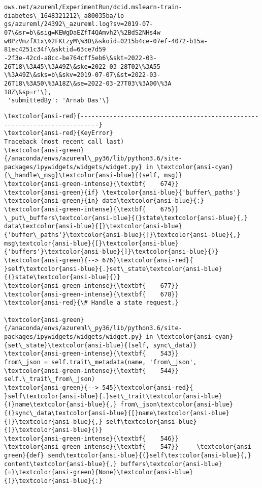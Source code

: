 \documentclass[11pt]{article}
\begin{document}
\begin{tcolorbox}[breakable, size=fbox, boxrule=.5pt, pad at break*=1mm, opacityfill=0]
\begin{Verbatim}[commandchars=\\\{\}]
ows.net/azureml/ExperimentRun/dcid.mslearn-train-diabetes\_1648321212\_a80035ba/lo
gs/azureml/24392\_azureml.log?sv=2019-07-07\&sr=b\&sig=KEWgDaEZfT4QAmvh2\%2BdS2NHs4w
w0PzVmzfX1x\%2FKtzyM\%3D\&skoid=0215b4ce-07ef-4072-b15a-81ec4251c34f\&sktid=63ce7d59
-2f3e-42cd-a8cc-be764cff5eb6\&skt=2022-03-26T18\%3A45\%3A49Z\&ske=2022-03-28T02\%3A55
\%3A49Z\&sks=b\&skv=2019-07-07\&st=2022-03-26T18\%3A50\%3A18Z\&se=2022-03-27T03\%3A00\%3A
18Z\&sp=r'\},
 'submittedBy': 'Arnab Das'\}
\end{Verbatim}
\end{tcolorbox}
        
    \begin{Verbatim}[commandchars=\\\{\}, frame=single, framerule=2mm, rulecolor=\color{outerrorbackground}]
\textcolor{ansi-red}{---------------------------------------------------------------------------}
\textcolor{ansi-red}{KeyError}                                  Traceback (most recent call last)
\textcolor{ansi-green}{/anaconda/envs/azureml\_py36/lib/python3.6/site-packages/ipywidgets/widgets/widget.py} in \textcolor{ansi-cyan}{\_handle\_msg}\textcolor{ansi-blue}{(self, msg)}
\textcolor{ansi-green-intense}{\textbf{    674}}                 \textcolor{ansi-green}{if} \textcolor{ansi-blue}{'buffer\_paths'} \textcolor{ansi-green}{in} data\textcolor{ansi-blue}{:}
\textcolor{ansi-green-intense}{\textbf{    675}}                     \_put\_buffers\textcolor{ansi-blue}{(}state\textcolor{ansi-blue}{,} data\textcolor{ansi-blue}{[}\textcolor{ansi-blue}{'buffer\_paths'}\textcolor{ansi-blue}{]}\textcolor{ansi-blue}{,} msg\textcolor{ansi-blue}{[}\textcolor{ansi-blue}{'buffers'}\textcolor{ansi-blue}{]}\textcolor{ansi-blue}{)}
\textcolor{ansi-green}{--> 676}\textcolor{ansi-red}{                 }self\textcolor{ansi-blue}{.}set\_state\textcolor{ansi-blue}{(}state\textcolor{ansi-blue}{)}
\textcolor{ansi-green-intense}{\textbf{    677}} 
\textcolor{ansi-green-intense}{\textbf{    678}}         \textcolor{ansi-red}{\# Handle a state request.}

\textcolor{ansi-green}{/anaconda/envs/azureml\_py36/lib/python3.6/site-packages/ipywidgets/widgets/widget.py} in \textcolor{ansi-cyan}{set\_state}\textcolor{ansi-blue}{(self, sync\_data)}
\textcolor{ansi-green-intense}{\textbf{    543}}                     from\_json = self.trait\_metadata(name, 'from\_json',
\textcolor{ansi-green-intense}{\textbf{    544}}                                                     self.\_trait\_from\_json)
\textcolor{ansi-green}{--> 545}\textcolor{ansi-red}{                     }self\textcolor{ansi-blue}{.}set\_trait\textcolor{ansi-blue}{(}name\textcolor{ansi-blue}{,} from\_json\textcolor{ansi-blue}{(}sync\_data\textcolor{ansi-blue}{[}name\textcolor{ansi-blue}{]}\textcolor{ansi-blue}{,} self\textcolor{ansi-blue}{)}\textcolor{ansi-blue}{)}
\textcolor{ansi-green-intense}{\textbf{    546}} 
\textcolor{ansi-green-intense}{\textbf{    547}}     \textcolor{ansi-green}{def} send\textcolor{ansi-blue}{(}self\textcolor{ansi-blue}{,} content\textcolor{ansi-blue}{,} buffers\textcolor{ansi-blue}{=}\textcolor{ansi-green}{None}\textcolor{ansi-blue}{)}\textcolor{ansi-blue}{:}


\end{Verbatim}
\end{document}

